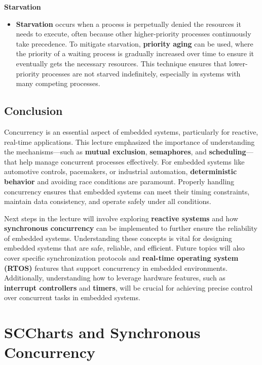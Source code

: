 \documentclass[
  14pt,
  a4paper,
  numbers=noendperiod,
  headinclude=true,
  footinclude=true,
  DIV=calc]{scrreprt}
\providecommand{\tightlist}{%
  \setlength{\itemsep}{0pt}\setlength{\parskip}{0pt}}\usepackage{longtable,booktabs,array}
\begin{document}
\textbf{Starvation}

\begin{itemize}
\tightlist
\item
  \textbf{Starvation} occurs when a process is perpetually denied the
  resources it needs to execute, often because other higher-priority
  processes continuously take precedence. To mitigate starvation,
  \textbf{priority aging} can be used, where the priority of a waiting
  process is gradually increased over time to ensure it eventually gets
  the necessary resources. This technique ensures that lower-priority
  processes are not starved indefinitely, especially in systems with
  many competing processes.
\end{itemize}

\section{Conclusion}\label{conclusion}

Concurrency is an essential aspect of embedded systems, particularly for
reactive, real-time applications. This lecture emphasized the importance
of understanding the mechanisms---such as \textbf{mutual exclusion},
\textbf{semaphores}, and \textbf{scheduling}---that help manage
concurrent processes effectively. For embedded systems like automotive
controls, pacemakers, or industrial automation, \textbf{deterministic
behavior} and avoiding race conditions are paramount. Properly handling
concurrency ensures that embedded systems can meet their timing
constraints, maintain data consistency, and operate safely under all
conditions.

Next steps in the lecture will involve exploring \textbf{reactive
systems} and how \textbf{synchronous concurrency} can be implemented to
further ensure the reliability of embedded systems. Understanding these
concepts is vital for designing embedded systems that are safe,
reliable, and efficient. Future topics will also cover specific
synchronization protocols and \textbf{real-time operating system (RTOS)}
features that support concurrency in embedded environments.
Additionally, understanding how to leverage hardware features, such as
\textbf{interrupt controllers} and \textbf{timers}, will be crucial for
achieving precise control over concurrent tasks in embedded systems.

\chapter{SCCharts and Synchronous
Concurrency}\label{sccharts-and-synchronous-concurrency}
\end{document}
